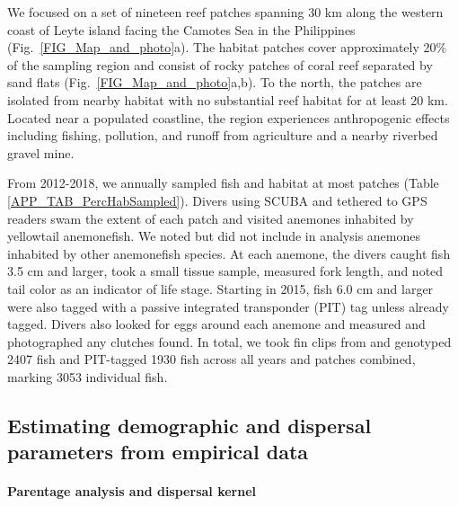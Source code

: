 \documentclass[12pt, oneside]{article}   	%
\begin{document}
We focused on a set of nineteen reef patches spanning 30 km along the western coast of Leyte island facing the Camotes Sea in the Philippines (Fig.\ \ref{FIG_Map_and_photo}a). The habitat patches cover approximately 20\% of the sampling region and consist of rocky patches of coral reef separated by sand flats (Fig.\ \ref{FIG_Map_and_photo}a,b). To the north, the patches are isolated from nearby habitat with no substantial reef habitat for at least 20 km. Located near a populated coastline, the region experiences anthropogenic effects including fishing, pollution, and runoff from agriculture and a nearby riverbed gravel mine.%

From 2012-2018, we annually sampled fish and habitat at most patches (Table \ref{APP_TAB_PercHabSampled}). Divers using SCUBA and tethered to GPS readers swam the extent of each patch and visited anemones inhabited by yellowtail anemonefish. We noted but did not include in analysis anemones inhabited by other anemonefish species. At each anemone, the divers caught fish 3.5 cm and larger, took a small tissue sample, measured fork length, and noted tail color as an indicator of life stage. Starting in 2015, fish 6.0 cm and larger were also tagged with a passive integrated transponder (PIT) tag unless already tagged. Divers also looked for eggs around each anemone and measured and photographed any clutches found. In total, we took fin clips from and genotyped 2407 fish and PIT-tagged 1930 fish across all years and patches combined, marking 3053 individual fish. %

\subsection*{Estimating demographic and dispersal parameters from empirical data} 

\paragraph*{Parentage analysis and dispersal kernel}  %
\end{document}
